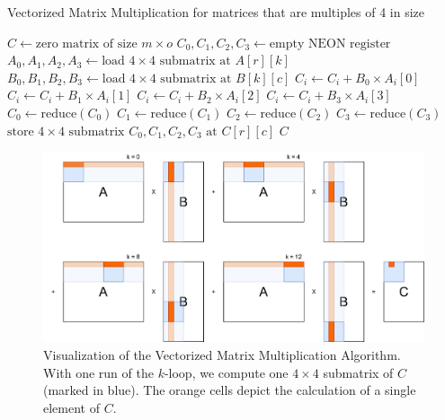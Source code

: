 \documentclass[11pt,a4paper]{report}
\theoremstyle{definition}
\begin{document}
\begin{algorithm}
  \caption{Vectorized Matrix Multiplication for matrices that are multiples of 4 in size}
  \label{alg:vectorizedmatrixmultiplication}
  \begin{algorithmic}
      \State $C \gets \text{zero matrix of size } m \times o$
          \State $C_0, C_1, C_2, C_3 \gets \text{empty NEON register}$
            \State $A_0, A_1, A_2, A_3 \gets \text{load } 4\times4 \text{ submatrix at } A[r][k]$
            \State $B_0, B_1, B_2, B_3 \gets \text{load } 4\times4 \text{ submatrix at } B[k][c]$
              \State $C_i \gets C_i + B_0 \times A_i[0]$
              \State $C_i \gets C_i + B_1 \times A_i[1]$
              \State $C_i \gets C_i + B_2 \times A_i[2]$
              \State $C_i \gets C_i + B_3 \times A_i[3]$
            \EndFor
          \EndFor
          \State $C_0 \gets \text{reduce}(C_0)$
          \State $C_1 \gets \text{reduce}(C_1)$
          \State $C_2 \gets \text{reduce}(C_2)$
          \State $C_3 \gets \text{reduce}(C_3)$
          \State $\text{store } 4\times4 \text{ submatrix } C_0, C_1, C_2, C_3 \text{ at } C[r][c]$
        \EndFor
      \EndFor
      \State \Return $C$
    \EndFunction
  \end{algorithmic}
\end{algorithm}

\begin{figure}
  \centering
  \includegraphics[width=\textwidth]{matmul/parallel_matmul.png}
  \caption{Visualization of the Vectorized Matrix Multiplication Algorithm. With one run of the $k$-loop, we compute one $4\times4$ submatrix of $C$ (marked in blue). The orange cells depict the calculation of a single element of $C$.}
  \label{fig:vectorizedmatrixmultiplication}
\end{figure}
\end{document}

